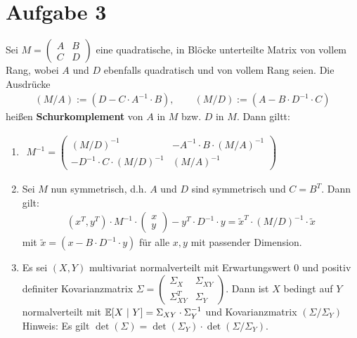 \documentclass[12pt,a4paper]{article}
\begin{document}
\section*{Aufgabe 3}
Sei $M=\begin{pmatrix}
A & B\\ C & D
\end{pmatrix}$ eine quadratische, in Blöcke unterteilte Matrix von vollem Rang, wobei $A$ und $D$ ebenfalls quadratisch und von vollem Rang seien. Die Ausdrücke
\begin{align*}
(M/A):=\left(D-C\cdot A^{-1}\cdot B\right),\qquad(M/D):=\left(A-B\cdot D^{-1}\cdot C\right)
\end{align*}
heißen \textbf{Schurkomplement} von $A$ in $M$ bzw. $D$ in $M$. Dann giltt:
\begin{enumerate}[label=\alph*)]
\item $\begin{aligned}
M^{-1}=\begin{pmatrix}
(M/D)^{-1} & -A^{-1}\cdot B\cdot(M/A)^{-1}\\
-D^{-1}\cdot C\cdot(M/D)^{-1} & (M/A)^{-1}
\end{pmatrix}
\end{aligned}$
\item Sei $M$ nun symmetrisch, d.h. $A$ und $D$ sind symmetrisch und $C=B^T$. Dann gilt:
\begin{align*}
(x^T,y^T)\cdot M^{-1}\cdot\begin{pmatrix}
x\\y
\end{pmatrix}-y^T\cdot D^{-1}\cdot y=\tilde{x}^T\cdot(M/D)^{-1}\cdot\tilde{x}
\end{align*}
mit $\tilde{x}=\left(x-B\cdot D^{-1}\cdot y\right)$ für alle $x,y$ mit passender Dimension.
\item Es sei $(X,Y)$ multivariat normalverteilt mit Erwartungswert 0 und positiv definiter Kovarianzmatrix $\Sigma=\begin{pmatrix}
\Sigma_X & \Sigma_{XY}\\ \Sigma_{XY}^T & \Sigma_Y
\end{pmatrix}$. Dann ist $X$ bedingt auf $Y$ normalverteilt mit $\mathbb{E}[X~|~Y]=\Sigma_{XY}\cdot\Sigma_{Y}^{-1}$ und Kovarianzmatrix $(\Sigma/\Sigma_Y)$\\
Hinweis: Es gilt $\det(\Sigma)=\det(\Sigma_Y)\cdot\det(\Sigma/\Sigma_Y)$.
\end{enumerate}
\end{document}
